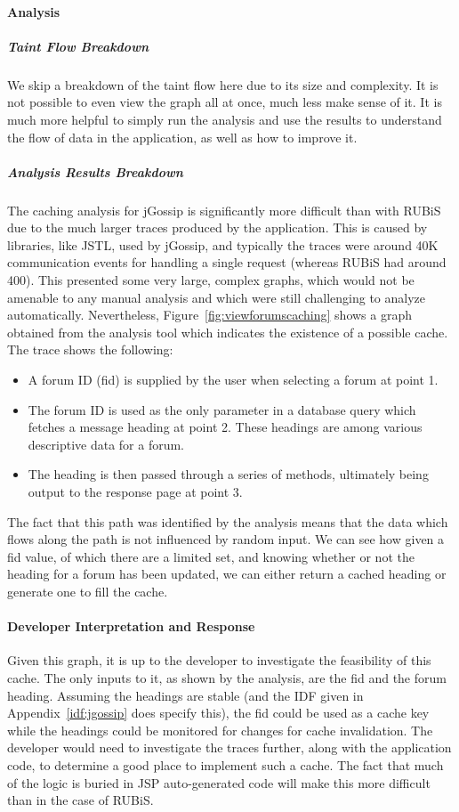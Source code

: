 \documentclass[msc,oneside]{ubcthesis}
\begin{document}
\paragraph{Analysis}
\subparagraph{Taint Flow Breakdown}
We skip a breakdown of the taint flow here due to its size and complexity. It is not possible to even view the graph all at once, much less make sense of it. It is much more helpful to simply run the analysis and use the results to understand the flow of data in the application, as well as how to improve it.

\subparagraph{Analysis Results Breakdown}
The caching analysis for jGossip is significantly more difficult than with RUBiS due to the much larger traces produced by the application. This is caused by libraries, like JSTL, used by jGossip, and typically the traces were around 40K communication events for handling a single request (whereas RUBiS had around 400). This presented some very large, complex graphs, which would not be amenable to any manual analysis and which were still challenging to analyze automatically. Nevertheless, Figure~\ref{fig:viewforumscaching} shows a graph obtained from the analysis tool which indicates the existence of a possible cache.\\

The trace shows the following:
\begin{itemize}
\item A forum ID (fid) is supplied by the user when selecting a forum at point 1.
\item The forum ID is used as the only parameter in a database query which fetches a message heading at point 2. These headings are among various descriptive data for a forum.
\item The heading is then passed through a series of methods, ultimately being output to the response page at point 3.
\end{itemize}

The fact that this path was identified by the analysis means that the data which flows along the path is not influenced by random input. We can see how given a fid value, of which there are a limited set, and knowing whether or not the heading for a forum has been updated, we can either return a cached heading or generate one to fill the cache.

\paragraph{Developer Interpretation and Response}
Given this graph, it is up to the developer to investigate the feasibility of this cache. The only inputs to it, as shown by the analysis, are the fid and the forum heading. Assuming the headings are stable (and the IDF given in Appendix~\ref{idf:jgossip} does specify this), the fid could be used as a cache key while the headings could be monitored for changes for cache invalidation. The developer would need to investigate the traces further, along with the application code, to determine a good place to implement such a cache. The fact that much of the logic is buried in JSP auto-generated code will make this more difficult than in the case of RUBiS.
\end{document}
